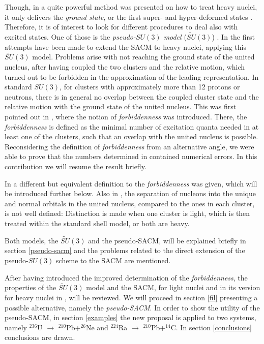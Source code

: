 \documentclass[12pt]{article}
\begin{document}
Though, in \cite{hunyadi} a quite powerful method was presented on how to treat heavy
nuclei, it only delivers the {\it ground state}, or the first super- and hyper-deformed states
\cite{cseh2006}. Therefore, it is of interest to
look for different procedures  to deal also with excited states. 
One of those is the {\it pseudo-$SU(3)$ model}
($\widetilde{SU}(3)$) \cite{hecht,arima}.
In \cite{cseh-scheid,cseh-algora} the first attempts have been made to extend
the SACM to heavy nuclei,  %
applying this $\widetilde{SU}(3)$ model.  
Problems arise with not reaching the ground state of the united nucleus, after having
coupled the two clusters and the relative motion,
which turned out to be forbidden in the approximation of the leading representation. 
In standard $SU(3)$, for clusters with approximately more than 12 protons or neutrons, there is
in general
no overlap between the coupled cluster state and the relative motion with 
the ground state of the united nucleus. This was first
pointed out in \cite{smirnov}, where the notion of {\it forbiddenness} was introduced.
There, the {\it forbiddenness} is defined as the minimal number of excitation quanta needed 
in at least one of the
clusters, such that an overlap with the united  nucleus is possible. 
Reconsidering the definition of {\it forbiddenness} from an alternative angle, we were able to prove 
\cite{huitz-2015} that the numbers determined in \cite{smirnov} contained
numerical errors. In this contribution we will resume the result briefly.


In  \cite{cseh-scheid,cseh-algora} a different but equivalent definition to the {\it forbiddenness} 
was given, which will be introduced further below.
Also in \cite{cseh-scheid,cseh-algora}, 
the separation of nucleons into the unique and normal orbitals in the united 
nucleus, compared to the ones in each cluster, is not well defined:
Distinction is made when one cluster is light, which is then treated within the
standard shell model, or both are heavy.

Both models, the $\widetilde{SU}(3)$ and the pseudo-SACM, will be explained 
briefly in section \ref{pseudo-sacm} and   the problems related to the direct extension 
of the pseudo-$SU(3)$ scheme to the SACM are mentioned.

After having introduced the improved determination of 
the {\it forbiddenness}, the properties of the $\widetilde{SU}(3)$ model and the SACM,  for light nuclei
and in its version for heavy nuclei in 
\cite{cseh-scheid,cseh-algora}, will be reviewed. 
We will proceed in section \ref{fil} presenting a possible alternative, namely the
{\it pseudo-SACM}. 
In order to show the utility of the pseudo-SACM, in section 
\ref{examples} the new proposal is applied to two systems, namely 
$^{236}$U $ \rightarrow$ $^{210}$Pb+$^{26}$Ne and
$^{224}$Ra $\rightarrow$ $^{210}$Pb+$^{14}$C.
 In section \ref{conclusions} conclusions are drawn.
\end{document}

